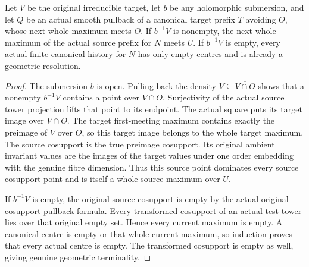 \begin{theorem}
\label{hir:original-pulled-stopped-source-next-encounter}
\leanok
Let $V$ be the original irreducible target, let $b$ be any holomorphic
submersion, and let $Q$ be an actual smooth pullback of a canonical target
prefix $T$ avoiding $O$, whose next whole maximum meets $O$.
If $b^{-1}V$ is nonempty, the next whole maximum of the actual source
prefix for $N$ meets $U$.  If $b^{-1}V$ is empty, every actual finite
canonical history for $N$ has only empty centres and is already a
geometric resolution.
\end{theorem}
\begin{proof}
The submersion $b$ is open.  Pulling back the density
$V\subseteq\overline{V\cap O}$ shows that a nonempty $b^{-1}V$ contains a
point over $V\cap O$.  Surjectivity of the actual source tower projection
lifts that point to its endpoint.  The actual square puts its target
image over $V\cap O$.  The target first-meeting maximum contains exactly
the preimage of $V$ over $O$, so this target image belongs to the whole
target maximum.  The source cosupport is the true preimage cosupport.
Its original ambient invariant values are the images of the target
values under one order embedding with the genuine fibre dimension.
Thus this source point dominates every source cosupport point and is
itself a whole source maximum over $U$.

If $b^{-1}V$ is empty, the original source cosupport is empty by the
actual original cosupport pullback formula.  Every transformed
cosupport of an actual test tower lies over that original empty set.
Hence every current maximum is empty.  A canonical centre is empty or
that whole current maximum, so induction proves that every actual
centre is empty.  The transformed cosupport is empty as well, giving
genuine geometric terminality.
\end{proof}

